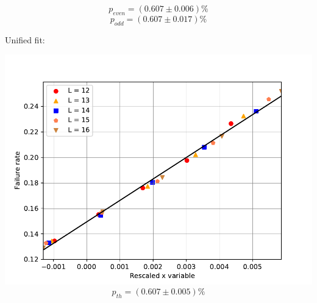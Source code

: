 \documentclass[pra]{revtex4-1}
\begin{document}
\[  p_{even} = (0.607 \pm 0.006)\% \]
\[  p_{odd} = (0.607 \pm 0.017)\% \]
\clearpage 

Unified fit: \begin{center} 

\includegraphics[width=.9\textwidth]{../graphs-paper2/wst-SPAM-seq-rescaled.pdf}
\[  p_{th} = (0.607 \pm 0.005)\% \] \end{center}
\clearpage
\end{document}
